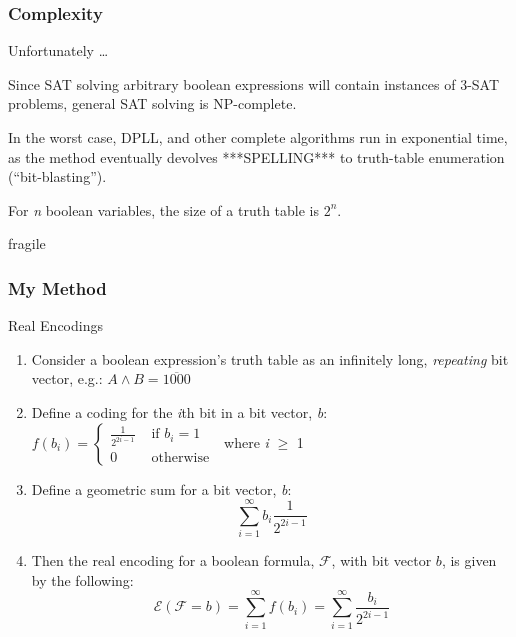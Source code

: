 \documentclass{beamer}
\begin{document}
\begin{frame}
\frametitle{Complexity}
\begin{block}
{Unfortunately \ldots} 

Since SAT solving arbitrary boolean expressions will contain instances of 3-SAT problems, general SAT solving is NP-complete.

In the worst case, DPLL, and other complete algorithms run in exponential time, as the method eventually devolves ***SPELLING*** to truth-table enumeration (``bit-blasting'').

For \emph n boolean variables, the size of a truth table is \(2^n\).

\end{block}
\end{frame}

\begin{frame}{fragile}
\frametitle{My Method}
\begin{block}
{Real Encodings}


\begin{enumerate}
\item {\tiny Consider a boolean expression's truth table as an infinitely long, \emph{repeating} bit vector, e.g.: \(A \land B = \overline{1000}\) }
\item {\tiny Define a coding for the \emph{i}th bit in a bit vector, \emph{b}: \( f(b_i) = \begin{cases} \frac{1}{2^{2i-1}} & \text{ if } b_i = 1\\ 0  & \text{ otherwise } \end{cases}\) where \emph{i} \(\geq\) 1 }
\item {\tiny Define a geometric sum for a bit vector, \emph b: }
  \[
  \sum_{i=1}^\infty b_i \frac{1}{2^{2i-1}}
  \]
\item {\tiny Then the real encoding for a boolean formula, \(\mathcal{F}\), with bit vector \(b\), is given by the following:}
  \[
  \mathcal{E}(\mathcal{F} = b) = \sum_{i=1}^\infty
 f(b_i) = \sum_{i=1}^\infty \frac{b_i}{2^{2i-1}}
  \]
\end{enumerate}


\end{block}
\end{frame}

\begin{comment}
\begin{cases} 
\frac{1}{2^{2i-1}} & \text{ if } b_i = 1\\ 0  & \text{ otherwise }
 \end{cases}
\end{comment}
\end{document}
